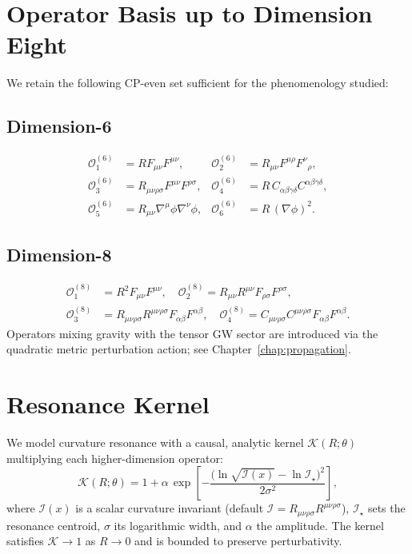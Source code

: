 \documentclass[12pt,a4paper,oneside]{scrbook}
\theoremstyle{definition}
\theoremstyle{remark}
\newcommand{\K}{\mathcal{K}}
\begin{document}
\section{Operator Basis up to Dimension Eight}
\label{sec:ops}
We retain the following CP-even set sufficient for the phenomenology studied:
\subsection*{Dimension-6}
\begin{align}
\mathcal{O}^{(6)}_{1} &= R F_{\mu\nu}F^{\mu\nu}, &
\mathcal{O}^{(6)}_{2} &= R_{\mu\nu}F^{\mu\rho}F^{\nu}{}_{\rho}, \\
\mathcal{O}^{(6)}_{3} &= R_{\mu\nu\rho\sigma}F^{\mu\nu}F^{\rho\sigma}, &
\mathcal{O}^{(6)}_{4} &= R\, C_{\alpha\beta\gamma\delta}C^{\alpha\beta\gamma\delta},\\
\mathcal{O}^{(6)}_{5} &= R_{\mu\nu} \nabla^\mu \phi \nabla^\nu \phi, &
\mathcal{O}^{(6)}_{6} &= R\, (\nabla\phi)^2.
\end{align}
\subsection*{Dimension-8}
\begin{align}
\mathcal{O}^{(8)}_{1} &= R^2 F_{\mu\nu}F^{\mu\nu},\quad
\mathcal{O}^{(8)}_{2} = R_{\mu\nu}R^{\mu\nu} F_{\rho\sigma}F^{\rho\sigma},\\
\mathcal{O}^{(8)}_{3} &= R_{\mu\nu\rho\sigma}R^{\mu\nu\rho\sigma} F_{\alpha\beta}F^{\alpha\beta},\quad
\mathcal{O}^{(8)}_{4} = C_{\mu\nu\rho\sigma}C^{\mu\nu\rho\sigma} F_{\alpha\beta}F^{\alpha\beta}.
\end{align}
Operators mixing gravity with the tensor GW sector are introduced via the quadratic metric perturbation action; see Chapter~\ref{chap:propagation}.
\section{Resonance Kernel}
\label{sec:kernel}
We model curvature resonance with a causal, analytic kernel $\K(R;\theta)$ multiplying each higher-dimension operator:
\begin{equation}
\K(R;\theta)= 1 + \alpha\, \exp\!\left[-\frac{\big(\ln\sqrt{\mathcal{I}(x)}-\ln \mathcal{I}_\star\big)^2}{2\sigma^2}\right],
\label{eq:kernel}
\end{equation}
where $\mathcal{I}(x)$ is a scalar curvature invariant (default $\mathcal{I}=R_{\mu\nu\rho\sigma}R^{\mu\nu\rho\sigma}$), $\mathcal{I}_\star$ sets the resonance centroid, $\sigma$ its logarithmic width, and $\alpha$ the amplitude. The kernel satisfies $\K\to 1$ as $R\to 0$ and is bounded to preserve perturbativity.
\end{document}
